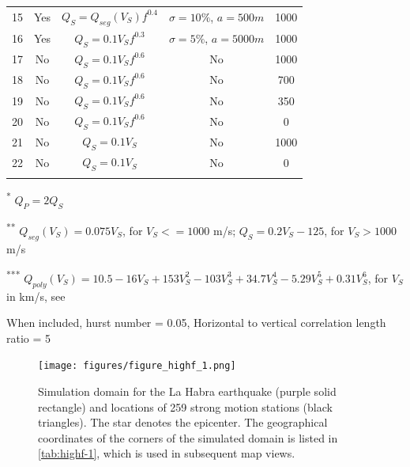 \begin{table}[!ht]
\begin{threeparttable}
{\begin{tabular}{@{}ccccc@{}}
        15       & Yes        & $Q_S=Q_{seg}(V_S)f^{0.4}$\tnote{\textsuperscript{**}}        & $\sigma=10\%$, $a=500m$ & 1000\\
        16        & Yes        & $Q_S=0.1V_Sf^{0.3}$              & $\sigma=5\%$, $a=5000m$ & 1000\\
        17       & No         & $Q_S=0.1V_Sf^{0.6}$               & No                     & 1000  \\
        18       & No         & $Q_S=0.1V_Sf^{0.6}$               & No                     & 700\\
        19       & No         & $Q_S=0.1V_Sf^{0.6}$               & No                     & 350\\
        20       & No         & $Q_S=0.1V_Sf^{0.6}$               & No                     & 0  \\
        21       & No         & $Q_S=0.1V_S$                      & No                     & 1000  \\
        22       & No         & $Q_S=0.1V_S$                      & No                     & 0  \\\bottomrule
        \\[-5mm]
      \end{tabular}%
    }
    \begin{tablenotes}
      \item[\textsuperscript{*}] \footnotesize $Q_P=2Q_S$\\[-6pt]
      \item[\textsuperscript{**}] \footnotesize $Q_{seg}(V_S)=0.075V_S$, for $V_S <= 1000$ m/s; $Q_S=0.2V_S - 125$, for $V_S > 1000$ m/s\\[-3pt]
      \item[\textsuperscript{***}] \footnotesize $Q_{poly}(V_S)=10.5 - 16V_S + 153V_S^2 - 103V_S^3 + 34.7V_S^4 - 5.29V_S^5 + 0.31V_S^6$, for $V_S$ in km/s, see \citet{taborda2014ground}\\[-4pt]
      \item[\textdagger] \footnotesize When included, hurst number = 0.05, Horizontal to vertical correlation length ratio = 5
    \end{tablenotes}
  \end{threeparttable}
\end{table}
\clearpage


\begin{figure}[!ht]
  \centering
  \texttt{[image: figures/figure\_highf\_1.png]}
  \caption{Simulation domain for the La Habra earthquake (purple solid rectangle) and locations of 259 strong motion stations (black triangles). The star denotes the epicenter. The geographical coordinates of the corners of the simulated domain is listed in \cref{tab:highf-1}, which is used in subsequent map views.}
  \label{fig:highf-1}
\end{figure}
\clearpage

